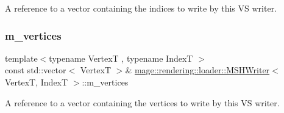 A reference to a vector containing the indices to write by this VS writer. \hypertarget{classmage_1_1rendering_1_1loader_1_1_m_s_h_writer_adf2b47491fdda0077ba3bf1053f343d0}{}\label{classmage_1_1rendering_1_1loader_1_1_m_s_h_writer_adf2b47491fdda0077ba3bf1053f343d0} 
\subsubsection{\texorpdfstring{m\+\_\+vertices}{m\_vertices}}
{\footnotesize\ttfamily template$<$typename VertexT , typename IndexT $>$ \\
const std\+::vector$<$ VertexT $>$\& \hyperlink{classmage_1_1rendering_1_1loader_1_1_m_s_h_writer}{mage\+::rendering\+::loader\+::\+M\+S\+H\+Writer}$<$ VertexT, IndexT $>$\+::m\+\_\+vertices\hspace{0.3cm}{\ttfamily [private]}}

A reference to a vector containing the vertices to write by this VS writer. 
